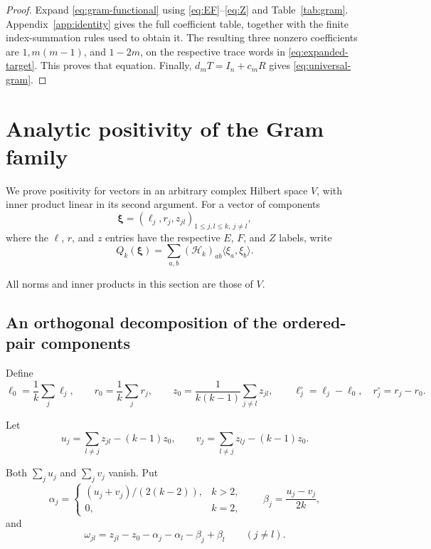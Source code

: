 \documentclass[11pt]{article}
\newcommand{\Id}{I_n}
\newcommand{\gH}{\mathscr H}
\newcommand{\ip}[2]{\langle #1,#2\rangle}
\begin{document}
\begin{proof}
Expand \eqref{eq:gram-functional} using
\eqref{eq:EF}--\eqref{eq:Z} and Table~\ref{tab:gram}.
Appendix~\ref{app:identity} gives the full coefficient table, together
with the finite index-summation rules used to obtain it.
The resulting three nonzero coefficients are \(1,m(m-1)\), and
\(1-2m\), on the respective trace words in
\eqref{eq:expanded-target}. This proves that equation.
Finally, \(d_mT=\Id+c_mR\) gives \eqref{eq:universal-gram}.
\end{proof}

\section{Analytic positivity of the Gram family}

We prove positivity for vectors in an arbitrary complex Hilbert space
\(V\), with inner product linear in its second argument.
For a vector of components
\[
 \boldsymbol{\xi}=(\ell_j,r_j,z_{jl})_{1\le j,l\le k,\ j\ne l},
\]
where the \(\ell\), \(r\), and \(z\) entries have the respective
\(E\), \(F\), and \(Z\) labels, write
\[
 Q_k(\boldsymbol{\xi})
 =\sum_{a,b}(\gH_k)_{ab}\ip{\xi_a}{\xi_b}.
\]

All norms and inner products in this section are those of \(V\).

\subsection{An orthogonal decomposition of the ordered-pair components}

Define
\[
 \ell_0=\frac1k\sum_j\ell_j,\qquad
 r_0=\frac1k\sum_jr_j,\qquad
 z_0=\frac1{k(k-1)}\sum_{j\ne l}z_{jl},
 \qquad
 \ell_j^\circ=\ell_j-\ell_0,\quad r_j^\circ=r_j-r_0.
\]

Let
\[
 u_j=\sum_{l\ne j}z_{jl}-(k-1)z_0,\qquad
 v_j=\sum_{l\ne j}z_{lj}-(k-1)z_0.
\]

Both \(\sum_ju_j\) and \(\sum_jv_j\) vanish. Put
\begin{equation}\label{eq:alpha-beta}
 \alpha_j=
 \begin{cases}
 (u_j+v_j)/(2(k-2)),&k>2,\\
 0,&k=2,
 \end{cases}
 \qquad
 \beta_j=\frac{u_j-v_j}{2k},
\end{equation}
and
\begin{equation}\label{eq:residual}
 \omega_{jl}=z_{jl}-z_0-\alpha_j-\alpha_l-\beta_j+\beta_l
 \qquad(j\ne l).
\end{equation}
\end{document}
